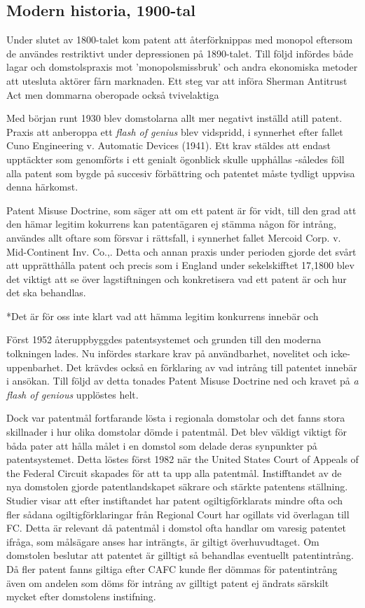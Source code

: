 \subsection{Modern historia, 1900-tal} 

Under slutet av 1800-talet kom patent att återförknippas med monopol eftersom de användes
restriktivt under depressionen  på 1890-talet. Till följd infördes både lagar och domstolspraxis mot 'monopolsmissbruk' och andra ekonomiska metoder att utesluta aktörer fårn marknaden. Ett steg var att införa Sherman Antitrust Act men dommarna oberopade också tvivelaktiga

Med början runt 1930 blev domstolarna allt mer negativt inställd atill
patent. Praxis att anberoppa ett \emph{flash of genius} blev vidspridd, i synnerhet efter fallet Cuno
Engineering v. Automatic Devices (1941). Ett krav stäldes att endast upptäckter som genomförts i ett
genialt ögonblick skulle upphållas -således föll alla patent som bygde på succesiv förbättring och
patentet måste tydligt uppvisa denna härkomst\cite{nard}. 

Patent Misuse Doctrine, som säger att om ett patent är för vidt, till den grad att den hämar legitim
kokurrens kan patentägaren ej stämma någon för intrång, användes allt oftare som försvar i rättsfall, i
synnerhet fallet Mercoid Corp. v. Mid-Continent Inv. Co.,\cite{nard}. Detta och annan praxis under
perioden gjorde det svårt att upprätthålla patent och precis som i England under sekelskifftet 17,1800
blev det viktigt att se över lagstiftningen och konkretisera vad ett patent är och hur det ska behandlas.

*Det är för oss inte klart vad att hämma legitim konkurrens innebär och 

Först 1952 återuppbyggdes patentsystemet och grunden till den moderna tolkningen lades. Nu infördes
starkare krav på användbarhet, novelitet och icke-uppenbarhet. Det krävdes också en förklaring av vad
intrång till patentet innebär i ansökan. Till följd av detta tonades Patent Misuse Doctrine ned och
kravet på \emph{a flash of genious} upplöstes helt\cite{nard}.

Dock var patentmål fortfarande lösta i regionala domstolar och det fanns stora skillnader i hur olika
domstolar dömde i patentmål\cite{nard}. Det blev väldigt viktigt för båda pater att hålla målet i en
domstol som delade deras synpunkter på patentsystemet. Detta löstes först 1982 när the United States
Court of Appeals of the Federal Circuit skapades för att ta upp alla patentmål\cite{nard}. Instifftandet
av de nya domstolen gjorde patentlandskapet säkrare och stärkte patentens ställning. Studier visar att
efter instiftandet har patent ogiltigförklarats mindre ofta och fler sådana ogiltigförklaringar från
Regional Court har ogillats vid överlagan till FC. \cite{henry} Detta är relevant då patentmål i domstol
ofta handlar om varesig patentet ifråga, som målsägare anses har inträngts, är giltigt överhuvudtaget.
Om domstolen beslutar att patentet är gilltigt så behandlas eventuellt patentintrång. Då fler patent
fanns giltiga efter CAFC kunde fler dömmas för patentintrång även om andelen som döms för intrång av
gilltigt patent ej ändrats särskilt mycket efter domstolens instifning. 

